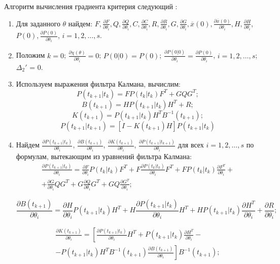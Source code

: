 \documentclass[a4paper,14pt]{extarticle}
\begin{document}
\newcommand{\pd}[2]{\frac{\partial #1}{\partial #2}}

Алгоритм вычисления градиента критерия следующий \cite{mono}:
\begin{enumerate}
\item Для заданного $\theta$ найдем: $F, \pd{F}{\theta_i}, Q, \pd{Q}{\theta_i},
C, \pd{C}{\theta_i}, R, \pd{R}{\theta_i}, G, \pd{G}{\theta_i}, \overline{x}(0),
\pd{\overline{x}(0)}{\theta_i}, H, \pd{H}{\theta_i}$, $P(0),
\pd{P(0)}{\theta_i}$, $i = 1, 2, \ldots, s$. 

\item Положим $k = 0$; $\pd{\chi(\theta)}{\theta_i} = 0$; $P(0|0) = P(0)$;
$\pd{P(0|0)}{\theta_i} = \pd{P(0)}{\theta_i}$, $i = 1, 2, \ldots, s$;
$\Delta_2'$ = 0.

\item Используем выражения фильтра Калмана, вычислим:
\[
	P(t_{k+1}|t_k) = F P(t_k|t_k) F^T + GQG^T;
\]
\[
	B(t_{k+1}) = H P(t_{k+1}|t_k) H^T + R;
\]
\[
	K(t_{k+1}) = P(t_{k+1}|t_k) H^T B^{-1}(t_{k+1});
\]
\[
	P(t_{k+1}|t_{k+1}) = \left[ I - K(t_{k+1}) H \right] P(t_{k+1}|t_k)
\]
\item Найдем $\pd{P(t_{k+1}|t_k)}{\theta_i}$, $\pd{B(t_{k+1})}{\theta_i}$,
$\pd{K(t_{k+1})}{\theta_i}$, $\pd{P(t_{k+1}|t_{k+1})}{\theta_i}$ для всех
$i = 1, 2, \ldots, s$ по формулам, вытекающим из уравнений фильтра Калмана:
\begin{equation*}
\begin{split}
	\pd{P(t_{k+1}|t_k)}{\theta_i} = \pd{F}{\theta_i} P(t_k|t_k) F^T + F
	\pd{P(t_k|t_k)}{\theta_i} F^T + F P(t_k|t_k) \pd{F^T}{\theta_i} + \\ +
	\pd{G}{\theta_i} Q G^T + G \pd{Q}{\theta_i} G^T + G Q \pd{G^T}{\theta_i};
\end{split}
\end{equation*}


\newcommand{\pdpk}[1]{\pd{#1}{\theta_i}}
\newcommand{\pred}[0]{t_{k+1}|t_k}
\newcommand{\est}[0]{t_k|t_k}
\newcommand{\fut}[0]{t_{k+1}}
\newcommand{\estfut}[0]{t_{k+1}|t_{k+1}}

\[
	\pdpk{B(t_{k+1})} = \pdpk{H} P(t_{k+1}|t_k) H^T + H \pdpk{P(\pred)} H^T +
	H P(\pred) \pdpk{H^T} + \pdpk{R}; 
\]

\newcommand{\inv}[1]{#1^{-1}}

\begin{equation*}
\begin{split}
	\pdpk{K(\fut)} = \left[ \pdpk{P(\pred)} H^T + P(\pred) \pdpk{H^T} - \right.
	\\ \left. -
	P(\pred) H^T \inv{B}(\fut) \pdpk{B(\fut)} \right] \inv{B}(\fut); \end{split}
\end{equation*}


\end{enumerate}
\end{document}
